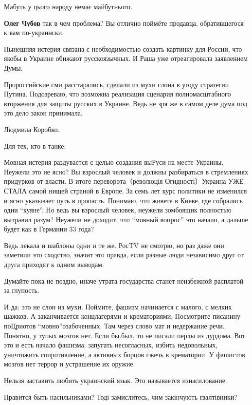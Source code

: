 \begin{itemize}
{\begin{itemize}
Мабуть у цього народу немає майбутнього.

\textbf{Олег Чубов} так в чем проблема? Вы отлично поймёте продавца, обратившегося к вам по-украински.

Нынешняя истерия связана с необходимостью создать картинку для России, что
якобы в Украине обижают русскоязычных. И Раша уже отреагировала заявлением
Думы.

Пророссийские сми расстарались, сделали из мухи слона в угоду стратегии Путина.
Подозреваю, что возможна реализация сценария полномасштабного вторжения для
защиты русских в Украине. Ведь не зря же в самом деле дума под это дело закон
принимала.

Людмила Коробко.

Для тех, кто в танке:

Мовная истерия раздувается с целью создания выРуси на месте Украины. Неужели
это не ясно? Вы взрослый человек и должны разбираться в стремлениях придурков
от власти. В итоге переворота（революція Огидності）Украина УЖЕ СТАЛА самой
нищей страной в Европе. За семь лет курс политики не изменился и ясно указывает
путь в пропасть. Понимаю, что живете в Киеве, где собрались одни \enquote{куяне}. Но
ведь вы взрослый человек, неужели зомбоящик полностью вытравил разум? Неужели
не доходит, что \enquote{мовный вопрос} это начало, а дальше будет как в Германии 33
года?

Ведь лекала и шаблоны одни и те же. РосTV не смотрю, но раз даже они заметили
это сходство, значит это правда, если разные люди независимо друг от друга
приходят к одним выводам.

Думайте пока не поздно, иначе утрата государства станет неизбежной расплатой за глупость.

И да: это не слон из мухи. Поймите, фашизм начинается с малого, с мелких
шажков. А заканчивается концлагерями и крематориями. Посмотрите писанину
поЦриотов \enquote{мовно}озабоченных. Там через слово мат и недержание речи. Понятно, у
тупых мозгов нет. Если бы.был, то не писали перлы из дурдома. Вот это и есть
начало фашизма: запугать несогласных, избить недовольных, уничтожить
сопротивление, а активных борцов сжечь в крематории. У фашистов мозгов нет
террор и устрашение их оружие.


Нельзя заставить любить украинский язык. Это называется изнасилование.

Нравится быть насильниками? Тоді замислитесь, чим закінчують ґвалтівники?




\end{itemize}}
\end{itemize}
